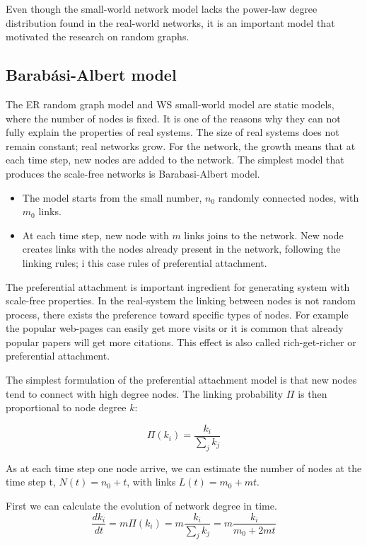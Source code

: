 Even though the small-world network model lacks the power-law degree distribution found in the real-world networks, it is an important model that motivated the research on random graphs. 

\subsection{Barab\' {a}si-Albert model}

The ER random graph model and WS small-world model are static models, where the number of nodes is fixed. It is one of the reasons why they can not fully explain the properties of real systems. The size of real systems does not remain constant; real networks grow. For the network, the growth means that at each time step, new nodes are added to the network. The simplest model that produces the scale-free networks is Barabasi-Albert model.

\begin{itemize}
	\item The model starts from the small number, $n_0$ randomly connected nodes, with $m_0$ links.
	\item At each time step, new node with $m$ links joins to the network. New node creates links with the nodes already present in the network, following the linking rules; i this case rules of preferential attachment. 
\end{itemize}
 
The preferential attachment is important ingredient for generating system with scale-free properties. In the real-system the linking between nodes is not random process, there exists the preference toward specific types of nodes. For example the popular web-pages can easily get more visits or it is common that already popular papers will get more citations. This effect is also called rich-get-richer or preferential attachment.

The simplest formulation of the preferential attachment model is that new nodes tend to connect with high degree nodes. The linking probability $\Pi$ is then proportional to node degree $k$:  

\begin{equation}
\Pi(k_i) = \frac{k_i}{\sum_jk_j} 
\end{equation} 

As at each time step one node arrive, we can estimate the number of nodes at the time step t, $N(t) = n_0+t$, with links $L(t) =m_0+ mt$. 

First we can calculate the evolution of network degree in time.
\begin{equation}
\frac{dk_i}{dt} = m\Pi(k_i) = m\frac{k_i}{\sum_jk_j} = m\frac{k_i}{m_0 + 2mt}
\end{equation}

